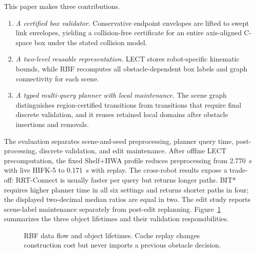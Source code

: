 \documentclass[journal]{IEEEtran}
\newcommand{\rbf}{RBF}
\newcommand{\cspace}{\mbox{C-space}}
\begin{document}
This paper makes three contributions.
\begin{enumerate}[nosep,leftmargin=*]
  \item \emph{A certified box validator.} Conservative endpoint envelopes are
  lifted to swept link envelopes, yielding a collision-free certificate for an
  entire axis-aligned \cspace{} box under the stated collision model.
  \item \emph{A two-level reusable representation.} LECT stores robot-specific
  kinematic bounds, while \rbf{} recomputes all obstacle-dependent box labels
  and graph connectivity for each scene.
  \item \emph{A typed multi-query planner with local maintenance.} The scene
  graph distinguishes region-certified transitions from transitions that
  require final discrete validation, and it reuses retained local domains after
  obstacle insertions and removals.
\end{enumerate}

The evaluation separates scene-and-seed preprocessing, planner query time,
post-processing, discrete validation, and edit maintenance. After offline LECT
precomputation, the fixed Shelf+IIWA profile reduces preprocessing
from 2.770~s with live HIFK-5 to 0.171~s with replay. The cross-robot results
expose a trade-off: RRT-Connect is usually faster per query but returns longer
paths. BIT* requires higher planner time in all six settings and returns shorter
paths in four; the displayed two-decimal median ratios are equal in two. The edit
study reports scene-label maintenance separately from post-edit replanning. Figure~\ref{fig:system_overview}
summarizes the three object lifetimes and their validation responsibilities.

\begin{figure}[!t]
\centering
{}
\caption{RBF data flow and object lifetimes. Cache replay changes construction
cost but never imports a previous obstacle decision.}
\label{fig:system_overview}
\end{figure}
\end{document}
